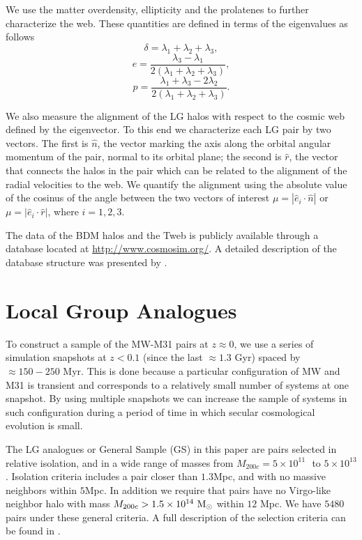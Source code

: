 \documentclass{emulateapj}
\newcommand{\mpc}{\rm{Mpc}}
\newcommand{\msun}{{\ifmmode{{\rm {M_{\odot}}}}\else{${\rm{M_{\odot}}}$}\fi}}
\begin{document}
We use the matter overdensity, ellipticity and the prolatenes to
further characterize the web. 
These quantities are defined in terms of the
eigenvalues as follows 
%
\begin{equation}
\delta = \lambda_1 + \lambda_2 + \lambda_3,
\end{equation}
%
\begin{equation}
e= \frac{\lambda_3 - \lambda_1}{2(\lambda_1 + \lambda_2 + \lambda_3)}, 
\end{equation}
%
\begin{equation}
p= \frac{\lambda_1 + \lambda_3 - 2\lambda_2}{2(\lambda_1 + \lambda_2 +
  \lambda_3)}.
\end{equation}

We also measure the alignment of the LG halos with respect to the
cosmic web defined by the eigenvector.
To this end we characterize each LG pair by two vectors. 
The first is $\hat{n}$, the vector marking the axis along the orbital angular
momentum of the pair, normal to its orbital plane; the second is
$\hat{r}$, the vector that connects the halos in the pair which can be
related to the alignment of the radial velocities to the web.
We quantify the alignment using the absolute value of the cosinus of
the angle between the two vectors of interest $\mu=|\hat{e}_i \cdot
\hat{n}|$ or $\mu=|\hat{e}_i\cdot \hat{r}|$, where $i=1,2,3$. 


The data of the BDM halos and the Tweb is publicly available through
a database located at \url{http://www.cosmosim.org/}. A detailed
description of the database structure was presented by \cite{Riebe2013}.

\section{Local Group Analogues}
\label{sec:lg_analogues}

To construct a sample of the MW-M31 pairs at $z\approx 0$, we use a
series of simulation snapshots  at $z<0.1$ (since the last $\approx
1.3$ Gyr) spaced by $\approx 150-250$ Myr. 
This is done because a particular configuration of MW and M31 is transient and
corresponds to a relatively small number of systems at one
snapshot. 
By using multiple snapshots we can increase the sample of systems in
such configuration during a period of time in which secular
cosmological evolution is small.  

The LG analogues or General Sample (GS) in this paper are pairs selected in
relative isolation, and in a wide range of masses from  $M_{200c}=5
\times 10^{11}$ \msun $ $ to $ 5 \times 10^{13}$ \msun.  
Isolation criteria includes a pair closer than $1.3$\mpc, and with no
massive neighbors within $5$\mpc.
In addition we require that pairs have no Virgo-like neighbor halo
with mass $M_{200c}>1.5 \times 10^{14}\ \rm M_{\odot}$ within $12$
Mpc.  
We have $5480$ pairs under these general criteria. 
A full description of the selection criteria can be found in
\citet{lganalogues,sat}.   
\end{document}
